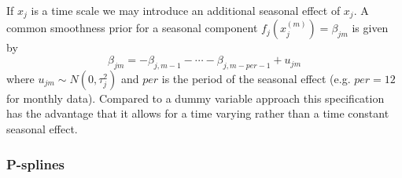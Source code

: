 \documentclass[11pt,a4paper,twoside]{bayesxarticle}
\begin{document}
If $x_j$ is a time  scale we may introduce an additional seasonal
effect of $x_j$. A common smoothness prior for a seasonal
component $f_j(x_j^{(m)}) = \beta_{jm}$ is given by
\begin{equation}
\beta_{jm} = -\beta_{j,m-1} - \cdots -
\beta_{j,m-per-1}+u_{jm}\label{seasonal}
\end{equation}
where $u_{jm}\sim N(0,\tau_j^{2})$ and $per$ is the period of the
seasonal effect (e.g. $per = 12$ for monthly data). Compared to a
dummy variable approach this specification has the advantage that it
allows for a time varying rather than a time constant seasonal
effect.


\subsubsection{P-splines}
\end{document}
